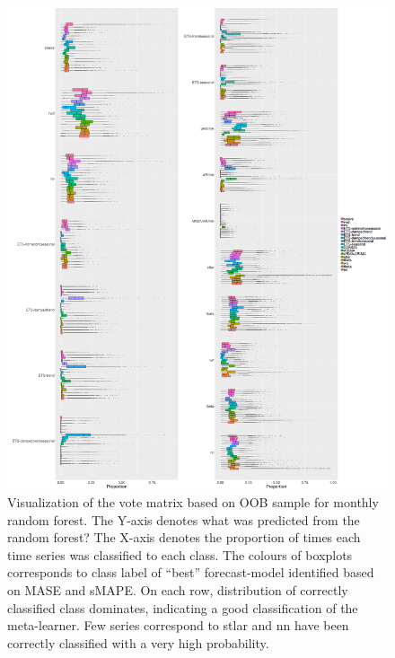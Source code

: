\documentclass[11pt,a4paper,]{article}
\begin{document}
\clearpage

\begin{figure}
\centering
\includegraphics{figures/oobquarterlymonthly2-1.png}
\caption{\label{fig:oobquarterlymonthly2} Visualization of the vote matrix
based on OOB sample for monthly random forest. The Y-axis denotes what
was predicted from the random forest? The X-axis denotes the proportion
of times each time series was classified to each class. The colours of
boxplots corresponds to class label of ``best'' forecast-model
identified based on MASE and sMAPE. On each row, distribution of
correctly classified class dominates, indicating a good classification
of the meta-learner. Few series correspond to stlar and nn have been
correctly classified with a very high probability.}
\end{figure}

\clearpage
\end{document}
